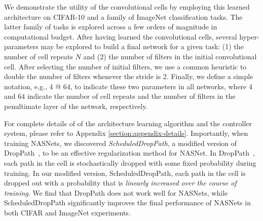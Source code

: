 \documentclass[10pt,twocolumn,letterpaper]{article}
\begin{document}
We demonstrate the utility of the convolutional cells by employing this learned architecture on CIFAR-10 and a family of ImageNet classification tasks. The latter family of tasks is explored across a few orders of magnitude in computational budget.
After having learned the convolutional cells, several hyper-parameters may be explored to build a final network for a given task: (1) the number of cell repeats $N$ and (2) the number of filters in the initial convolutional cell. After selecting the number of initial filters, we use a common heuristic to double the number of filters whenever the stride is 2.
Finally, we define a simple notation, e.g.,  $4$ @ $64$, to indicate these two parameters in all networks, where $4$ and $64$ indicate the number of cell repeats and the number of filters in the penultimate layer of the network, respectively.

For complete details of of the architecture learning algorithm and the controller system, please refer to  Appendix \ref{section:appendix-details}. Importantly, when training NASNets, we discovered \emph{ScheduledDropPath}, a modified version of DropPath~\cite{larsson2016fractalnet}, to be an effective regularization method for NASNet. In DropPath~\cite{larsson2016fractalnet}, each path in the cell is stochastically dropped with some fixed probability during training.  In our modified version, ScheduledDropPath, each path in the cell is dropped out with a probability that is \emph{linearly increased over the course of training}. We find that DropPath does not work well for NASNets, while ScheduledDropPath  significantly improves the final performance of NASNets in both CIFAR and ImageNet experiments.
\end{document}
